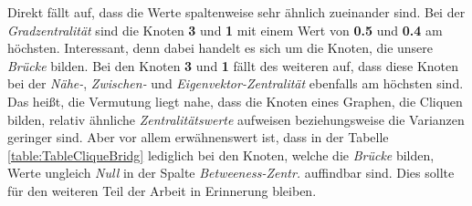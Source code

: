 Direkt fällt auf, dass die Werte spaltenweise sehr ähnlich zueinander sind. Bei der \textit{Gradzentralität} sind die Knoten \textbf{3} und \textbf{1} mit einem Wert von \textbf{0.5} und \textbf{0.4} am höchsten. Interessant, denn dabei handelt es sich um die Knoten, die unsere \textit{Brücke} bilden. Bei den Knoten \textbf{3} und \textbf{1} fällt des weiteren auf, dass diese Knoten bei der \textit{Nähe-}, \textit{Zwischen-} und \textit{Eigenvektor-Zentralität} ebenfalls am höchsten sind. Das heißt, die Vermutung liegt nahe, dass die Knoten eines Graphen, die Cliquen bilden, relativ ähnliche \textit{Zentralitätswerte} aufweisen beziehungsweise die Varianzen geringer sind. Aber vor allem erwähnenswert ist, dass in der Tabelle \ref{table:TableCliqueBridg} lediglich bei den Knoten, welche die \textit{Brücke} bilden, Werte ungleich \textit{Null} in der Spalte \textit{Betweeness-Zentr.} auffindbar sind. Dies sollte für den weiteren Teil der Arbeit in Erinnerung bleiben. 



